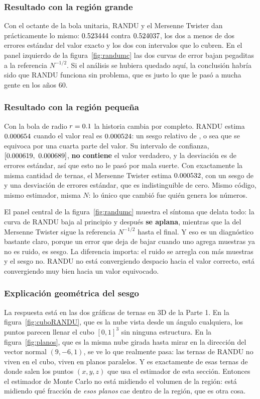 \documentclass[11pt,letterpaper]{article}
\begin{document}
\subsubsection{Resultado con la región grande} Con el octante de la bola
unitaria, RANDU y el Mersenne Twister dan prácticamente lo mismo:
$0.523444$ contra $0.524037$, los dos a menos de dos errores
estándar del valor exacto y los dos con intervalos que lo cubren. En el panel
izquierdo de la figura~\ref{fig:randumc} las dos curvas de error bajan
pegaditas a la referencia $N^{-1/2}$. Si el análisis se hubiera quedado aquí,
la conclusión habría sido que RANDU funciona sin problema, que es justo lo
que le pasó a mucha gente en los años 60.

\subsubsection{Resultado con la región pequeña} Con la bola de radio
$r = 0.1$ la historia cambia por completo. RANDU estima
$0.000654$ cuando el valor real es $0.000524$: un sesgo relativo de
\RelativoRanduBola, o sea que se equivoca por una cuarta parte del valor. Su
intervalo de confianza, $[0.000619,\ 0.000689]$, \textbf{no contiene} el valor
verdadero, y la desviación es de \SigmasRanduBola{} errores estándar, así que
esto no le pasó por mala suerte. Con
exactamente la misma cantidad de ternas, el Mersenne Twister estima
$0.000532$, con un sesgo de \RelativoMTBola{} y una desviación de
\SigmasMTBola{} errores estándar, que es indistinguible de cero. Mismo
código, mismo estimador, misma $N$: lo único que cambió fue quién genera los
números.

El panel central de la figura~\ref{fig:randumc} muestra el síntoma que
delata todo: la curva de RANDU baja al principio y después \textbf{se
aplana}, mientras que la del Mersenne Twister sigue la referencia
$N^{-1/2}$ hasta el final. Y eso es un diagnóstico bastante claro, porque un
error que deja de bajar cuando uno agrega muestras ya no es ruido, es sesgo.
La diferencia importa: el ruido se arregla con más muestras y el sesgo no.
RANDU no está convergiendo despacio hacia el valor correcto, está
convergiendo muy bien hacia un valor equivocado.

\subsubsection{Explicación geométrica del sesgo} La respuesta está en las dos
gráficas de ternas en 3D de la Parte 1. En la figura~\ref{fig:cuboRANDU}, que
es la nube vista desde un ángulo cualquiera, los puntos parecen llenar el
cubo $[0,1]^3$ sin ninguna estructura. En la figura~\ref{fig:planos}, que es
la misma nube girada hasta mirar en la dirección del vector normal
$(9,-6,1)$, se ve lo que realmente pasa: las ternas de RANDU no viven en el
cubo, viven en \PlanosRandu{} planos paralelos. Y es exactamente de esas
ternas de donde salen los puntos $(x,y,z)$ que usa el estimador de esta
sección. Entonces el estimador de Monte Carlo no está midiendo el volumen de
la región: está midiendo qué fracción de \emph{esos planos} cae dentro de la
región, que es otra cosa.
\end{document}
